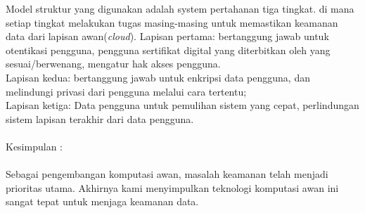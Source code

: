 Model struktur yang digunakan adalah system pertahanan tiga tingkat. di mana setiap tingkat melakukan tugas masing-masing untuk memastikan keamanan data dari lapisan awan(\textit{cloud}). Lapisan pertama: bertanggung jawab untuk otentikasi pengguna, pengguna  sertifikat  digital  yang diterbitkan oleh yang sesuai/berwenang, mengatur  hak akses pengguna.\\
Lapisan kedua: bertanggung jawab untuk enkripsi data pengguna, dan melindungi privasi dari pengguna melalui cara tertentu;\\
Lapisan ketiga: Data pengguna untuk pemulihan sistem yang cepat, perlindungan sistem lapisan terakhir dari data pengguna.\\\\
Kesimpulan :\\\\
Sebagai pengembangan komputasi awan, masalah keamanan telah menjadi prioritas utama. Akhirnya kami menyimpulkan teknologi komputasi awan ini sangat tepat untuk  menjaga keamanan data.